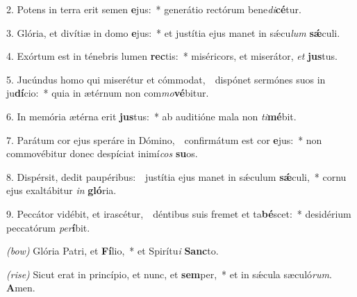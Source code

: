 2. Potens in terra erit semen \textbf{e}jus:~* generátio rectórum bene\textit{di}\textbf{cé}tur.

3. Glória, et divítiæ in domo \textbf{e}jus:~* et justítia ejus manet in s\'{\ae}cu\textit{lum} \textbf{s\'{\ae}}culi.

4. Exórtum est in ténebris lumen \textbf{rec}tis:~* miséricors, et miserátor, \textit{et} \textbf{jus}tus.

5. Jucúndus homo qui miserétur et cómmodat,~\GreDagger\ dispónet sermónes suos in ju\textbf{dí}cio:~* quia in ætérnum non com\textit{mo}\textbf{vé}bitur.

6. In memória ætérna erit \textbf{jus}tus:~* ab auditióne mala non \textit{ti}\textbf{mé}bit.

7. Parátum cor ejus speráre in Dómino,~\GreDagger\  confirmátum est cor \textbf{e}jus:~* non commovébitur donec despíciat inimí\textit{cos} \textbf{su}os.

8. Dispérsit, dedit paupéribus:~\GreDagger\ justítia ejus manet in s\'{\ae}culum \textbf{s\'{\ae}}culi,~* cornu ejus exaltábitur \textit{in} \textbf{gló}ria.

9. Peccátor vidébit, et irascétur,~\GreDagger\ déntibus suis fremet et ta\textbf{bé}scet:~* desidérium peccatórum \textit{per}\textbf{í}bit.

\textit{(bow)}  Glória Patri, et \textbf{Fí}lio,~* et Spirítu\textit{i} \textbf{Sanc}to.

\textit{(rise)}  Sicut erat in princípio, et nunc, et \textbf{sem}per,~* et in s\'{\ae}cula sæculó\textit{rum}. \textbf{A}men.